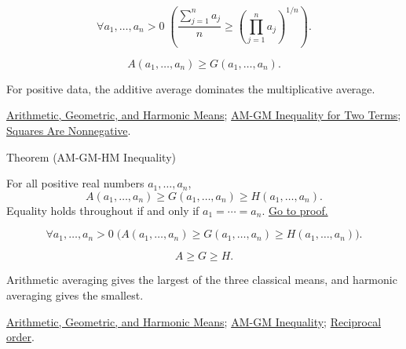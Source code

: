 \begin{remark*}
\[
\forall a_1,\dots,a_n>0\;
\left(
\frac{\sum_{j=1}^{n}a_j}{n}
\ge
\left(\prod_{j=1}^{n}a_j\right)^{1/n}
\right).
\]
\end{remark*}

\begin{remark*}
\[
A(a_1,\dots,a_n)\ge G(a_1,\dots,a_n).
\]
\end{remark*}

\begin{remark*}[Interpretation]
For positive data, the additive average dominates the multiplicative average.
\end{remark*}

\begin{dependencies}
\hyperref[def:classical-means]{Arithmetic, Geometric, and Harmonic Means};
\hyperref[thm:ineq-am-gm-two]{AM-GM Inequality for Two Terms};
\hyperref[thm:square-nonnegative]{Squares Are Nonnegative}.
\end{dependencies}

\begin{theorembox}{Theorem (AM-GM-HM Inequality)}
\begin{theorem}[AM-GM-HM Inequality]
\label{thm:ineq-am-gm-hm}
For all positive real numbers $a_1,\dots,a_n$,
\[
A(a_1,\dots,a_n)\ge G(a_1,\dots,a_n)\ge H(a_1,\dots,a_n).
\]
Equality holds throughout if and only if $a_1=\cdots=a_n$.
\hyperref[prf:ineq-am-gm-hm]{Go to proof.}
\end{theorem}
\end{theorembox}

\begin{remark*}
\[
\forall a_1,\dots,a_n>0\;
\bigl(A(a_1,\dots,a_n)\ge G(a_1,\dots,a_n)\ge H(a_1,\dots,a_n)\bigr).
\]
\end{remark*}

\begin{remark*}
\[
A\ge G\ge H.
\]
\end{remark*}

\begin{remark*}[Interpretation]
Arithmetic averaging gives the largest of the three classical means, and
harmonic averaging gives the smallest.
\end{remark*}

\begin{dependencies}
\hyperref[def:classical-means]{Arithmetic, Geometric, and Harmonic Means};
\hyperref[thm:ineq-am-gm]{AM-GM Inequality};
\hyperref[thm:ineq-reciprocal-positive]{Reciprocal order}.
\end{dependencies}

